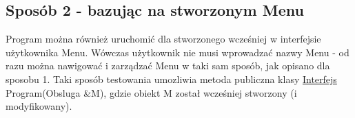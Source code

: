 \subsection*{Sposób 2 -\/ bazując na stworzonym Menu}

Program można również uruchomić dla stworzonego wcześniej w interfejsie użytkownika Menu. Wówczas użytkownik nie musi wprowadzać nazwy Menu -\/ od razu można nawigować i zarządzać Menu w taki sam sposób, jak opisano dla sposobu 1. Taki sposób testowania umozliwia metoda publiczna klasy \hyperlink{classInterfejs}{Interfejs} Program(\-Obsluga \&\-M), gdzie obiekt M został wcześniej stworzony (i modyfikowany). 